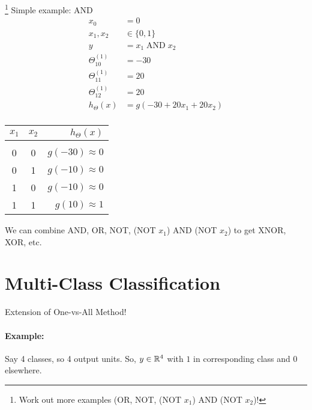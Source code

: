 \footnote{Work out more examples (OR, NOT, (NOT $x_1$) AND (NOT $x_2$)!}
Simple example: AND
\begin{align*}
	x_0               & = 0                          \\
	x_1, x_2          & \in \{0,1\}                  \\
	y                 & = x_1 \operatorname{AND} x_2 \\
	\Theta_{10}^{(1)} & = -30                        \\
	\Theta_{11}^{(1)} & = 20                         \\
	\Theta_{12}^{(1)} & = 20                         \\
	h_\Theta(x)       & = g(-30 + 20x_1 + 20x_2)     \\
\end{align*}
\begin{table*}[h!]
	\begin{center}
		\begin{tabular}{c c | r}
			$x_1$ & $x_2$ & $h_\Theta(x)$      \\
			\hline                             \\
			0     & 0     & $g(-30) \approx 0$ \\
			0     & 1     & $g(-10) \approx 0$ \\
			1     & 0     & $g(-10) \approx 0$ \\
			1     & 1     & $g(10) \approx 1$  \\
		\end{tabular}
	\end{center}
\end{table*}

We can combine AND, OR, NOT, (NOT $x_1$) AND (NOT $x_2$) to get
XNOR, XOR, etc.

\section{Multi-Class Classification}
Extension of One-vs-All Method!

\paragraph{Example:} Say 4 classes, so 4 output units.
So, $y \in \mathbb{R}^4$ with $1$ in corresponding class and $0$ elsewhere.

